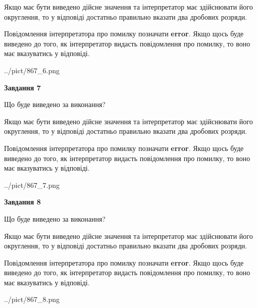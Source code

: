 \documentclass[12pt, ukrainian]{article}
\begin{document}
{\begin {Large}
Якщо має бути виведено дійсне значення та інтерпретатор має здійснювати його округлення, 
то у відповіді достатньо правильно вказати два дробових розряди.

Повідомлення інтерпретатора про помилку позначати \textbf{error}.
Якщо щось буде виведено до того, як інтерпретатор видасть повідомлення про помилку, 
то воно має вказуватись у відповіді. \par

\begin{center}
	{../pict/867_6.png}
\end{center}
\newpage

{\begin {center}\textbf{Завдання 7}\end {center}}\par
Що буде виведено за виконання? \par

Якщо має бути виведено дійсне значення та інтерпретатор має здійснювати його округлення, 
то у відповіді достатньо правильно вказати два дробових розряди.

Повідомлення інтерпретатора про помилку позначати \textbf{error}.
Якщо щось буде виведено до того, як інтерпретатор видасть повідомлення про помилку, 
то воно має вказуватись у відповіді. \par

\begin{center}
	{../pict/867_7.png}
\end{center}
\newpage

{\begin {center}\textbf{Завдання 8}\end {center}}\par
Що буде виведено за виконання? \par

Якщо має бути виведено дійсне значення та інтерпретатор має здійснювати його округлення, 
то у відповіді достатньо правильно вказати два дробових розряди.

Повідомлення інтерпретатора про помилку позначати \textbf{error}.
Якщо щось буде виведено до того, як інтерпретатор видасть повідомлення про помилку, 
то воно має вказуватись у відповіді. \par

\begin{center}
	{../pict/867_8.png}
\end{center}
\newpage


\end{Large}}
\end{document}

